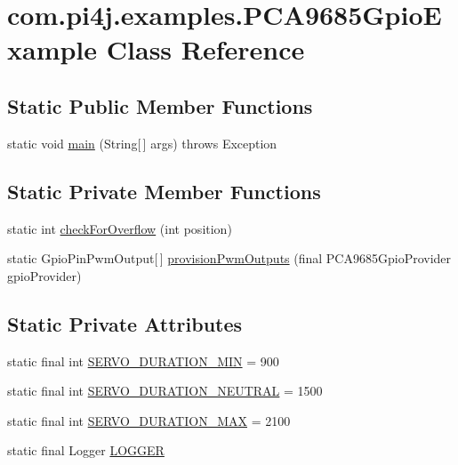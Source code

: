 \hypertarget{classcom_1_1pi4j_1_1examples_1_1PCA9685GpioExample}{}\section{com.\+pi4j.\+examples.\+P\+C\+A9685\+Gpio\+Example Class Reference}
\label{classcom_1_1pi4j_1_1examples_1_1PCA9685GpioExample}
\subsection*{Static Public Member Functions}
\begin{DoxyCompactItemize}
\item 
static void \hyperlink{classcom_1_1pi4j_1_1examples_1_1PCA9685GpioExample_a2f4ebb809d8f181d1b82982e27c918ad}{main} (String\mbox{[}$\,$\mbox{]} args)  throws Exception 
\end{DoxyCompactItemize}
\subsection*{Static Private Member Functions}
\begin{DoxyCompactItemize}
\item 
static int \hyperlink{classcom_1_1pi4j_1_1examples_1_1PCA9685GpioExample_a028d40423940844fbe79435807760e22}{check\+For\+Overflow} (int position)
\item 
static Gpio\+Pin\+Pwm\+Output\mbox{[}$\,$\mbox{]} \hyperlink{classcom_1_1pi4j_1_1examples_1_1PCA9685GpioExample_a62cd816ec402f89aabe6398a3a14bebd}{provision\+Pwm\+Outputs} (final P\+C\+A9685\+Gpio\+Provider gpio\+Provider)
\end{DoxyCompactItemize}
\subsection*{Static Private Attributes}
\begin{DoxyCompactItemize}
\item 
static final int \hyperlink{classcom_1_1pi4j_1_1examples_1_1PCA9685GpioExample_a3bd354e9bc3231f26be78a5c70aafd39}{S\+E\+R\+V\+O\+\_\+\+D\+U\+R\+A\+T\+I\+O\+N\+\_\+\+M\+I\+N} = 900
\item 
static final int \hyperlink{classcom_1_1pi4j_1_1examples_1_1PCA9685GpioExample_ad1209411ca9274f90edc19471b8a21bf}{S\+E\+R\+V\+O\+\_\+\+D\+U\+R\+A\+T\+I\+O\+N\+\_\+\+N\+E\+U\+T\+R\+A\+L} = 1500
\item 
static final int \hyperlink{classcom_1_1pi4j_1_1examples_1_1PCA9685GpioExample_a116497e7648049a1baabca49ea7370ee}{S\+E\+R\+V\+O\+\_\+\+D\+U\+R\+A\+T\+I\+O\+N\+\_\+\+M\+A\+X} = 2100
\item 
static final Logger \hyperlink{classcom_1_1pi4j_1_1examples_1_1PCA9685GpioExample_a1df543636eb9042d5af3ad292f6d6ae1}{L\+O\+G\+G\+E\+R}
\end{DoxyCompactItemize}


